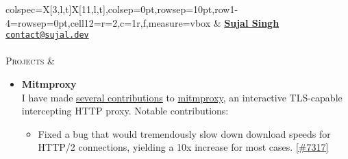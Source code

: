 \documentclass[11pt]{article}
\begin{document}
    \noindent%
    \begin{tblr}%
    {colspec={X[3,l,t]X[11,l,t]},colsep=0pt,rowsep=10pt,row{1-4}={rowsep=0pt},cell{1}{2}={r=2,c=1}{r,f},measure=vbox}%
        \href{https://github.com/sujaldev}{\faGithub}
        \hspace{5pt} \href{https://linkedin.com/in/sujal-singh}{\faLinkedin}
        \hspace{5pt} \href{https://youtube.com/@sujaldev}{\faYoutube}
        &
        \href{https://sujal.dev/}{\textbf{\Huge Sujal Singh}}
        \\
        \href{mailto:contact@sujal.dev}{\texttt{contact@sujal.dev}}
        \\ \\
        \textsc{\large Projects} &
        \vspace*{-1.5\topsep}
        \begin{itemize}[topsep=0pt,leftmargin=15pt]
            \item \textbf{Mitmproxy}\\
            I have made
            \href{https://github.com/mitmproxy/mitmproxy/commits?author=sujaldev}{\color{blue}several contributions} to
            \href{https://github.com/mitmproxy/mitmproxy}{\color{blue}mitmproxy}, an
            interactive TLS-capable intercepting HTTP proxy. Notable contributions:
            \begin{itemize}[nosep,left=0pt..1em]
                \item Fixed a bug that would tremendously slow down download speeds for HTTP/2 connections, yielding
                a 10x increase for most cases.
                \href{https://github.com/mitmproxy/mitmproxy/pull/7317}{\color{blue}[\#7317]}
            \end{itemize}


\end{itemize}
\end{tblr}
\end{document}
